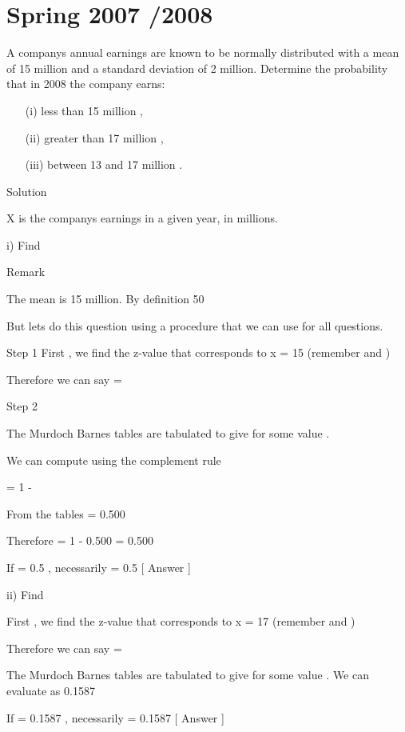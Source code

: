 ﻿\section{Spring 2007 /2008}
A companys annual earnings are known to be normally distributed with a mean of 15 million and a standard deviation of 2 million. Determine the probability that in 2008 the company earns:

\begin{itemize}
	\item[(i)]           less than 15 million  ,
	\item[(ii)]          greater than 17 million  ,
	\item[(iii)]         between 13 and 17 million  .
\end{itemize}
Solution 

X is the companys earnings in a given year, in millions.

i)  Find  

Remark

The mean is  15 million. By definition 50%

But lets do this question using a procedure that we can use for all questions.

Step 1
First , we find the z-value that corresponds to x = 15 
(remember   and   )


Therefore we can say   =  


Step 2

The Murdoch Barnes tables are tabulated to give   for some value  . 

We can compute   using the complement rule

= 1 -  

From the tables   = 0.500

Therefore    = 1 - 0.500 = 0.500

If    = 0.5 , necessarily   = 0.5     [    Answer    ] 



ii)  Find  

First , we find the z-value that corresponds to x = 17 
(remember   and   )


Therefore we can say   =  

The Murdoch Barnes tables are tabulated to give   for some value  . 
We can evaluate   as 0.1587

If    = 0.1587 , necessarily   = 0.1587     [    Answer    ] 

